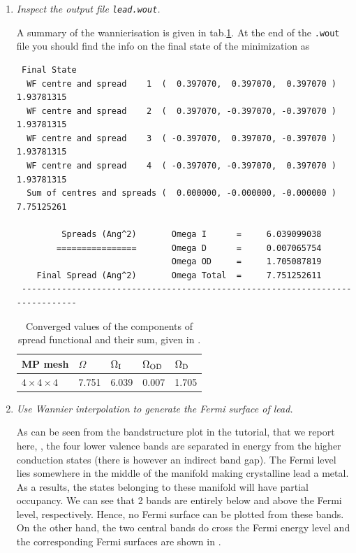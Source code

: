 \begin{enumerate}
\item {\it Inspect the output file {\tt lead.wout}.}

A summary of the wannierisation is given in tab.\ref{tab2.1}. At the end of the {\tt .wout} file you should find the info on the final state of the minimization as
\begin{tcolorbox}[sharp corners,boxrule=0.5pt]
{\small
\begin{verbatim}
 Final State
  WF centre and spread    1  (  0.397070,  0.397070,  0.397070 )     1.93781315
  WF centre and spread    2  (  0.397070, -0.397070, -0.397070 )     1.93781315
  WF centre and spread    3  ( -0.397070,  0.397070, -0.397070 )     1.93781315
  WF centre and spread    4  ( -0.397070, -0.397070,  0.397070 )     1.93781315
  Sum of centres and spreads (  0.000000, -0.000000, -0.000000 )     7.75125261

         Spreads (Ang^2)       Omega I      =     6.039099038
        ================       Omega D      =     0.007065754
                               Omega OD     =     1.705087819
    Final Spread (Ang^2)       Omega Total  =     7.751252611
 ------------------------------------------------------------------------------
\end{verbatim}
}
\end{tcolorbox}


\begin{table}[h!]
\centering
\caption{Converged values of the components of spread functional and their sum, given in \angsqd{}.}
\begin{tabular}{@{} lllll @{}}\toprule[1.5pt]
MP mesh & $\Omega$ & $\Omega\tinysub{I}$ & $\Omega\tinysub{OD}$ & $\Omega\tinysub{D}$ \\\midrule
$4\times4\times4$ & 7.751 &6.039 & 0.007 & 1.705 \\\bottomrule[1pt]
\end{tabular}\label{tab2.1}
\end{table}

\item {\it Use Wannier interpolation to generate the Fermi surface of lead.}

As can be seen from the bandstructure plot in the \Wannier{} tutorial, that we report here, \cf{} , the four lower valence bands are separated in energy from the higher conduction states (there is however an indirect band gap). The Fermi level lies somewhere in the middle of the manifold making crystalline lead a metal. As a results, the states belonging to these manifold will have partial occupancy.
We can see that 2 bands are entirely below and above the Fermi level, respectively. Hence, no Fermi surface can be plotted from these bands. On the other hand, the two central bands do cross the Fermi energy level and the corresponding Fermi surfaces are shown in .


\end{enumerate}
